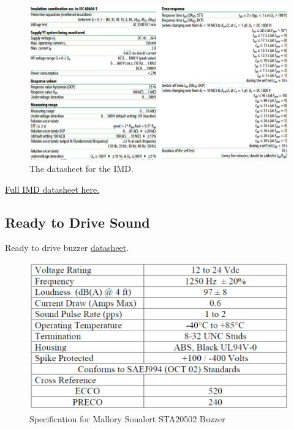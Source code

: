 \documentclass{article}
\begin{document}
\begin{figure} [!ht]
	\centering  %
	
	\includegraphics[width=\textwidth]{Formula_IMD_Datasheet.png}
	
	\caption{The datasheet for the IMD.}
	
	\label{fig:IMD_Datasheet}
\end{figure}

\href{http://www.bender-us.com/documents/IR155-10_datasheet_NAE1012821.pdf}{Full IMD datasheet here.}

\setcounter{subsection}{11}
\subsection{Ready to Drive Sound}\label{Ready to Drive}
Ready to drive buzzer \href{http://www.mallory-sonalert.com/specifications/STA20502.PDF}{datasheet}. \newline
\begin{figure}[H]
	\includegraphics[width=\linewidth]{Buzzer_Specifications}
	\caption{Specification for Mallory Sonalert STA20502 Buzzer}
\end{figure}
\end{document}
